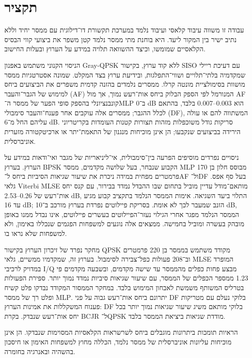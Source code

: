\chapter*{\texthebrew{תקציר}}
\label{sec:abstract-hebrew}
\begin{otherlanguage}{hebrew}
\begin{justify}
עבודה זו משווה עיבוד קלאסי ועיבוד נלמד במערכת תקשורת דו־דילוגית עם ממסר יחיד וללא נתיב ישיר בין המקור ליעד. היא בוחנת מתי ממסר נלמד קטן משפר את ביצועי קווי הבסיס הקלאסיים שמומשו, וכיצד ההשוואה תלויה במידע על הערוץ ובעלות החישוב.

הניסוי הקנוני משתמש באפנון \textenglish{Gray-QPSK} ללא קוד ערוץ, בקישור \textenglish{SISO} עם דעיכת ריילי שמקדמיה בלתי־תלויים ושווי־התפלגות, ובידיעת ערוץ בצד המקלט. שמונה אסטרטגיות ממסר מושוות בסימולציית מונטה קרלו. ממסרים נלמדים בהזנה קדמית משפרים את הביצועים ביחס למימוש של הגבר־והעבר (\textenglish{AF}) המנורמל לפי הספק הבלוק ביחס אות־רעש נמוך, אך מול \textenglish{AF} קונבנציונלי בהספק סופי הפער של ממסר ה־\textenglish{MLP} ב־\textenglish{0 dB} הוא \textenglish{0.003--0.007} בלבד, בהתאם לכלל ההגבר; ממסרים אלה עוקבים אחר פענח־והעבר סימבולי (\textenglish{DF}), המשתווה להם או עולה עליהם החל מ־\textenglish{6 dB}. סריקות גודל משוכפלות מזהות תצורות קטנות העומדות בקריטריוני הירידה בביצועים שנקבעו; הן אינן מוכיחות מנגנון של התאמת־יתר או ארכיטקטורה מזערית אוניברסלית.

ניסויים נפרדים מוסיפים הפרעה בין־סימבולית, אי־ליניאריות של מגבר ואי־ודאות במידע על הערוץ. בערוץ \textenglish{BPSK} הקבוע שנבחר, בעל שלושה מקדמים, ממסר \textenglish{MLP} מבוסס חלון בן 170 פרמטרים מפחית במידה ניכרת את שיעור שגיאות הסיביות ביחס ל־\textenglish{AF} ול־\textenglish{DF} בעל סף אפס. גלאי \textenglish{Viterbi MLSE} מותאם־מודל עדיין מוביל בתחום שבו ההבדל נמדד בבירור, עם קנס יחס אות־רעש של \textenglish{0.26--2.53 dB}, התלוי ביעד השגיאה. אימות הממסר הנלמד בתקציב קבוע מגיע עד \textenglish{16 dB}; הזנב שמעבר לכך לא אומת. בסריקת פיילוטים נפרדת בערוץ מורכב ב־\textenglish{10 dB}, הממסר הנלמד מפגר אחרי הגילוי נעזר־הפיילוטים בעשרים פיילוטים, אינו נבדל ממנו באופן מובהק בעשרה ומוביל בחמישה. ממצאים אלה נוגעים למשפחות הפגמים שנכללו באימון, ולא למשפחות שלא נראו בו.

מחקר נפרד של זיכרון הערוץ בקישור \textenglish{QPSK} מקודד משתמש בממסר בן 220 פרמטרים וב־208 פעולות כפל־צבירה לסימבול. בערוץ זה, שמקדמיו ממשיים, גלאי \textenglish{MLSE} המופרד במדויק לרכיבי \textenglish{I/Q} מבצע פחות כפלים מהממסר עד שישה מקדמים, ובשבעה מקדמים פי \textenglish{1.23} ממספר הכפלים של הממסר, עם שיעור שגיאות סיביות נמדד נמוך יותר. ספירת הפעולות בטרליס המשותף משמשת לאבחון המימוש בלבד. במחקר הממסור המקודד נבדקו פלט קשיח ופלט רך של ממסר \textenglish{MLP}. יתרונם ביחס אות־רעש גבוה על פני \textenglish{DF} בלוקי נעלם עם מטריקות פענוח המשקללות את אמינות הערוץ: \textenglish{DF} בלוקי מותאם משיג שיעור שגיאות נמוך יותר בכל יחס אות־רעש שנבדק. בקרת \textenglish{BCJR} ל־\textenglish{QPSK} מודדת שגיאות ביציאת הממסר בלבד.

הראיות תומכות ביתרונות מוגבלים ביחס לשרשראות הקלאסיות המסוימות שנבדקו. הן אינן מוכיחות עליונות אוניברסלית של ממסר נלמד, הכללה מחוץ למשפחות האימון או חיסכון בהשהיה ובאנרגיה בחומרה.
\end{justify}
\end{otherlanguage}
